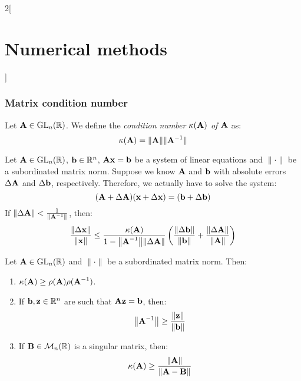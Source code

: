 \documentclass[../../../main.tex]{subfiles}
\begin{document}
\begin{multicols}{2}[\section{Numerical methods}]
  \subsubsection{Matrix condition number}
  \begin{definition}
    Let $\boldsymbol{\mathrm{A}}\in\mathrm{GL}_n(\mathbb{R})$. We define the \textit{condition number $\kappa(\boldsymbol{\mathrm{A}})$ of $\boldsymbol{\mathrm{A}}$} as: $$\kappa(\boldsymbol{\mathrm{A}})=\|\boldsymbol{\mathrm{A}}\|\|\boldsymbol{\mathrm{A}}^{-1}\|$$
  \end{definition}
  \begin{theorem}
    Let $\boldsymbol{\mathrm{A}}\in\mathrm{GL}_n(\mathbb{R})$, $\boldsymbol{\mathrm{b}}\in\mathbb{R}^n$, $\boldsymbol{\mathrm{A}}\boldsymbol{\mathrm{x}}=\boldsymbol{\mathrm{b}}$ be a system of linear equations and $\|\cdot\|$ be a subordinated matrix norm. Suppose we know $\boldsymbol{\mathrm{A}}$ and $\boldsymbol{\mathrm{b}}$ with absolute errors $\Delta\boldsymbol{\mathrm{A}}$ and $\Delta\boldsymbol{\mathrm{b}}$, respectively. Therefore, we actually have to solve the system: $$(\boldsymbol{\mathrm{A}}+\Delta\boldsymbol{\mathrm{A}})(\boldsymbol{\mathrm{x}}+\Delta \boldsymbol{\mathrm{x}})=(\boldsymbol{\mathrm{b}}+\Delta\boldsymbol{\mathrm{b}})$$ If $\|\Delta\boldsymbol{\mathrm{A}}\|<\frac{1}{\|\boldsymbol{\mathrm{A}}^{-1}\|}$, then: $$\frac{\|\Delta \boldsymbol{\mathrm{x}}\|}{\|\boldsymbol{\mathrm{x}}\|}\leq\frac{\kappa(\boldsymbol{\mathrm{A}})}{1-\norm{\boldsymbol{\mathrm{A}}^{-1}}\norm{\Delta\boldsymbol{\mathrm{A}}}}\left(\frac{\norm{\Delta\boldsymbol{\mathrm{b}}}}{\norm{\boldsymbol{\mathrm{b}}}}+\frac{\norm{\Delta\boldsymbol{\mathrm{A}}}}{\norm{\boldsymbol{\mathrm{A}}}}\right)$$
  \end{theorem}
  \begin{theorem}
    Let $\boldsymbol{\mathrm{A}}\in\mathrm{GL}_n(\mathbb{R})$ and $\|\cdot\|$ be a subordinated matrix norm. Then:
    \begin{enumerate}
      \item $\kappa(\boldsymbol{\mathrm{A}})\geq\rho(\boldsymbol{\mathrm{A}})\rho(\boldsymbol{\mathrm{A}}^{-1})$.
      \item If $\boldsymbol{\mathrm{b}},\boldsymbol{\mathrm{z}}\in\mathbb{R}^n$ are such that $\boldsymbol{\mathrm{A}}\boldsymbol{\mathrm{z}}=\boldsymbol{\mathrm{b}}$, then: $$\norm{\boldsymbol{\mathrm{A}}^{-1}}\geq\frac{\norm{\boldsymbol{\mathrm{z}}}}{\norm{\boldsymbol{\mathrm{b}}}}$$
      \item If $\boldsymbol{\mathrm{B}}\in\mathcal{M}_n(\mathbb{R})$ is a singular matrix, then: $$\kappa(\boldsymbol{\mathrm{A}})\geq\frac{\norm{\boldsymbol{\mathrm{A}}}}{\norm{\boldsymbol{\mathrm{A}}-\boldsymbol{\mathrm{B}}}}$$
    \end{enumerate}
  \end{theorem}

\end{multicols}
\end{document}
